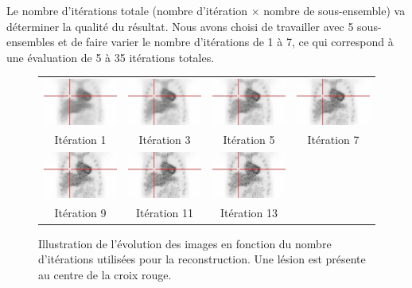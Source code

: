 Le nombre d'itérations totale (nombre d'itération $\times$ nombre de sous-ensemble) va déterminer la qualité du résultat. Nous avons choisi de travailler avec 5 sous-ensembles et de faire varier le nombre d'itérations de 1 à 7, ce qui correspond à une évaluation de 5 à 35 itérations totales.

\begin{figure}
\centering
\begin{tabular}{c c c c}
 \includegraphics[width=3cm]{images/ite1} & \includegraphics[width=3cm]{images/ite3} & \includegraphics[width=3cm]{images/ite5} & \includegraphics[width=3cm]{images/ite7} \\
Itération 1  & Itération 3 & Itération 5 & Itération 7 \\
\hline
 \includegraphics[width=3cm]{images/ite9} & \includegraphics[width=3cm]{images/ite11} & \includegraphics[width=3cm]{images/ite13} &  \\
Itération 9  & Itération 11 & Itération 13 &\\
\end{tabular}

\caption[Illustration de l'évolution des lésions en fonction du nombre d'itérations]{Illustration de l'évolution des images en fonction du nombre d'itérations utilisées pour la reconstruction. Une lésion est présente au centre de la croix rouge.}
\label{fig:evolRecon}
\end{figure}

